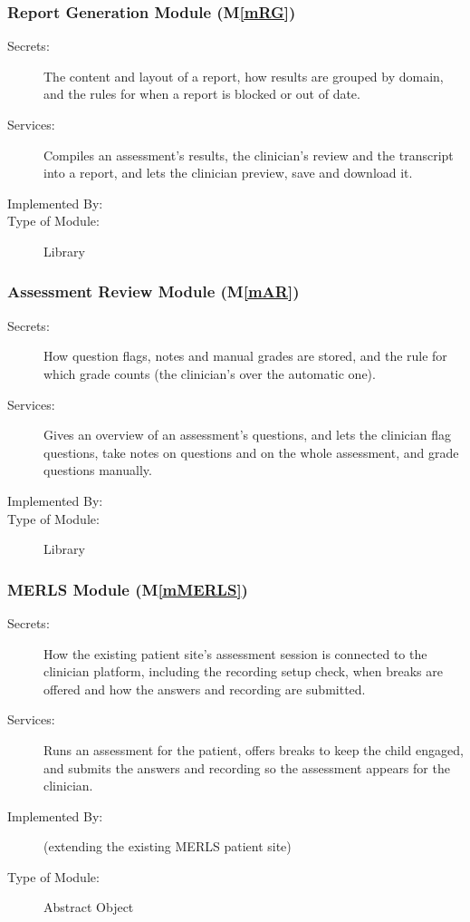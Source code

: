 \documentclass[12pt, titlepage]{article}
\newcommand{\mref}[1]{M\ref{#1}}
\begin{document}
\subsubsection{Report Generation Module (\mref{mRG})}
\begin{description}
\item[Secrets:]The content and layout of a report, how results are grouped by domain, and the rules for when a report is blocked or out of date.
\item[Services:]Compiles an assessment's results, the clinician's review and the transcript into a report, and lets the clinician preview, save and download it.
\item[Implemented By:] \progname{}
\item[Type of Module:] Library
\end{description}

\subsubsection{Assessment Review Module (\mref{mAR})}
\begin{description}
\item[Secrets:]How question flags, notes and manual grades are stored, and the rule for which grade counts (the clinician's over the automatic one).
\item[Services:]Gives an overview of an assessment's questions, and lets the clinician flag questions, take notes on questions and on the whole assessment, and grade questions manually.
\item[Implemented By:] \progname{}
\item[Type of Module:] Library
\end{description}

\subsubsection{MERLS Module (\mref{mMERLS})}
\begin{description}
\item[Secrets:]How the existing patient site's assessment session is connected to the clinician platform, including the recording setup check, when breaks are offered and how the answers and recording are submitted.
\item[Services:]Runs an assessment for the patient, offers breaks to keep the child engaged, and submits the answers and recording so the assessment appears for the clinician.
\item[Implemented By:] \progname{} (extending the existing MERLS patient site)
\item[Type of Module:] Abstract Object
\end{description}
\end{document}
